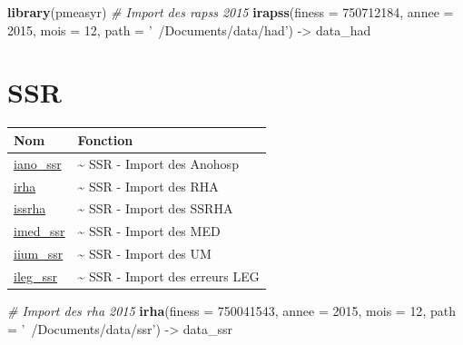 \documentclass[]{book}
\newenvironment{Shaded}{\begin{snugshade}}{\end{snugshade}}
\newcommand{\CommentTok}[1]{\textcolor[rgb]{0.56,0.35,0.01}{\textit{#1}}}
\newcommand{\DataTypeTok}[1]{\textcolor[rgb]{0.13,0.29,0.53}{#1}}
\newcommand{\DecValTok}[1]{\textcolor[rgb]{0.00,0.00,0.81}{#1}}
\newcommand{\KeywordTok}[1]{\textcolor[rgb]{0.13,0.29,0.53}{\textbf{#1}}}
\newcommand{\NormalTok}[1]{#1}
\newcommand{\StringTok}[1]{\textcolor[rgb]{0.31,0.60,0.02}{#1}}
\begin{document}
\begin{Shaded}
\begin{Highlighting}[]
\KeywordTok{library}\NormalTok{(pmeasyr)}
\CommentTok{# Import des rapss 2015}
\KeywordTok{irapss}\NormalTok{(}\DataTypeTok{finess =} \DecValTok{750712184}\NormalTok{,}
       \DataTypeTok{annee =} \DecValTok{2015}\NormalTok{,}
       \DataTypeTok{mois =} \DecValTok{12}\NormalTok{,}
       \DataTypeTok{path =} \StringTok{'~/Documents/data/had'}\NormalTok{) ->}\StringTok{ }\NormalTok{data_had}
\end{Highlighting}
\end{Shaded}

\hypertarget{ssr}{%
\section{SSR}\label{ssr}}

\begin{longtable}[]{@{}ll@{}}
\toprule
Nom & Fonction\tabularnewline
\midrule
\endhead
\href{https://guillaumepressiat.github.io/pmeasyr/reference/iano_ssr.html}{iano\_ssr} & \textasciitilde{} SSR - Import des Anohosp\tabularnewline
\href{https://guillaumepressiat.github.io/pmeasyr/reference/irha.html}{irha} & \textasciitilde{} SSR - Import des RHA\tabularnewline
\href{https://guillaumepressiat.github.io/pmeasyr/reference/issrha.html}{issrha} & \textasciitilde{} SSR - Import des SSRHA\tabularnewline
\href{https://guillaumepressiat.github.io/pmeasyr/reference/imed_ssr.html}{imed\_ssr} & \textasciitilde{} SSR - Import des MED\tabularnewline
\href{https://guillaumepressiat.github.io/pmeasyr/reference/iium_ssr.html}{iium\_ssr} & \textasciitilde{} SSR - Import des UM\tabularnewline
\href{https://guillaumepressiat.github.io/pmeasyr/reference/ileg_ssr.html}{ileg\_ssr} & \textasciitilde{} SSR - Import des erreurs LEG\tabularnewline
\bottomrule
\end{longtable}

\begin{Shaded}
\begin{Highlighting}[]
\CommentTok{# Import des rha 2015}
\KeywordTok{irha}\NormalTok{(}\DataTypeTok{finess =} \DecValTok{750041543}\NormalTok{,}
     \DataTypeTok{annee =} \DecValTok{2015}\NormalTok{,}
     \DataTypeTok{mois =} \DecValTok{12}\NormalTok{,}
     \DataTypeTok{path =} \StringTok{'~/Documents/data/ssr'}\NormalTok{) ->}\StringTok{ }\NormalTok{data_ssr}
\end{Highlighting}
\end{Shaded}
\end{document}
